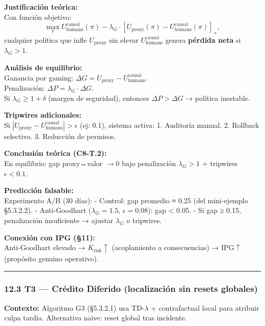 \textbf{Justificación teórica:}\\
Con función objetivo: \[
\max_{\pi} U_{\text{humans}}^{\text{causal}}(\pi) - \lambda_G \cdot [U_{\text{proxy}}(\pi) - U_{\text{humans}}^{\text{causal}}(\pi)]_+,
\] cualquier política que infle \(U_{\text{proxy}}\) sin elevar
\(U_{\text{humans}}^{\text{causal}}\) genera \textbf{pérdida neta} si
\(\lambda_G > 1\).

\textbf{Análisis de equilibrio:}\\
Ganancia por gaming:
\(\Delta G = U_{\text{proxy}} - U_{\text{humans}}^{\text{causal}}\).\\
Penalización: \(\Delta P = \lambda_G \cdot \Delta G\).\\
Si \(\lambda_G \geq 1 + \delta\) (margen de seguridad), entonces
\(\Delta P > \Delta G\) → política inestable.

\textbf{Tripwires adicionales:}\\
Si \(|U_{\text{proxy}} - U_{\text{humans}}^{\text{causal}}| > \epsilon\)
(ej: 0.1), sistema activa: 1. Auditoría manual. 2. Rollback selectivo.
3. Reducción de permisos.

\textbf{Conclusión teórica (C8-T.2):}\\
En equilibrio: gap proxy↔valor \(\to 0\) bajo penalización
\(\lambda_G > 1\) + tripwires \(\epsilon < 0.1\).

\textbf{Predicción falsable:}\\
Experimento A/B (30 días): - Control: gap promedio ≈ 0.25 (del
mini-ejemplo §5.3.2.2). - Anti-Goodhart (\(\lambda_G=1.5\),
\(\epsilon=0.08\)): gap \textless{} 0.05. - Si gap ≥ 0.15, penalización
insuficiente → ajustar \(\lambda_G\) o tripwires.

\textbf{Conexión con IPG (§11):}\\
Anti-Goodhart elevado → \(K_{\text{risk}} \uparrow\) (acoplamiento a
consecuencias) → \(\mathrm{IPG} \uparrow\) (propósito genuino
operativo).

\begin{center}\rule{0.5\linewidth}{0.5pt}\end{center}

\subsubsection{12.3 T3 --- Crédito Diferido (localización sin resets
globales)}\label{t3-cruxe9dito-diferido-localizaciuxf3n-sin-resets-globales}

\textbf{Contexto:} Algoritmo G3 (§5.3.2.1) usa TD-\(\lambda\) +
contrafactual local para atribuir culpa tardía. Alternativa naive: reset
global tras incidente.

